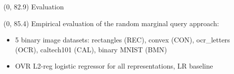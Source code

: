 \documentclass[final]{beamer}
\begin{document}
\begin{frame}{}
  
      
    

  
      
  
  \begin{textblock}{80}(0, 82.9)
    Evaluation
  \end{textblock}
  
  \begin{textblock}{25.2}(0, 85.4)
    \small
    Empirical evaluation of the random marginal query approach:
    \begin{itemize}
    \item 5 binary image datasets: rectangles (\textsf{REC}),
      convex (\textsf{CON}), ocr\_letters (\textsf{OCR}), caltech101
      (\textsf{CAL}), binary MNIST (\textsf{BMN})
    \item  OVR L2-reg logistic regressor for all representations, \textsf{LR}
      baseline  
    \end{itemize}
  \end{textblock}
  

\end{frame}
\end{document}
